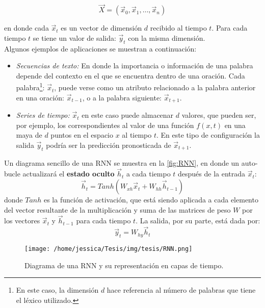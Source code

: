 \begin{equation}
  \label{eq:xdataRNN}
  \vec{X} = (\vec{x}_0, \vec{x}_1, \dots , \vec{x}_n)
\end{equation}

en donde cada $\vec{x}_t$ es un vector de dimensión $d$ recibido al tiempo $t$. Para cada tiempo $t$ se tiene un valor de salida: $\vec{y}_t$ con la misma dimensión.
\\
Algunos ejemplos de aplicaciones se muestran a continuación:

\begin{itemize}[label=\textcolor{CTtitle}{\textbullet}]
\item \emph{Secuencias de texto:} En donde la importancia o información de una palabra depende del contexto en el que se encuentra dentro de una oración. Cada palabra\footnote{En este caso, la dimensión $d$ hace referencia al número de palabras que tiene el léxico utilizado.}: $\vec{x}_t$,  puede verse como un atributo relacionado a la palabra anterior en una oración: $\vec{x}_{t-1}$, o a la palabra siguiente: $\vec{x}_{t+1}$.
 \item \emph{Series de tiempo:} $\vec{x}_t$ en este caso puede almacenar $d$ valores, que pueden ser, por ejemplo, los correspondientes al valor de una función $f(x,t)$ en una maya de $d$ puntos en el espacio $x$ al tiempo $t$. En este tipo de configuración la salida $\vec{y}_t$ podría ser la predicción pronosticada de $\vec{x}_{t+1}$.
 \end{itemize}
  
Un diagrama sencillo de una \acs{RNN} se muestra en la \autoref{fig:RNN}, en donde un auto-bucle actualizará el \textbf{estado oculto} $\vec{h}_t$ a cada tiempo $t$ después de la entrada $\vec{x}_t$:
\begin{equation}
  \label{eq:hidden}
  \vec{h}_t = Tanh(W_{xh}\vec{x}_t + W_{hh} \vec{h}_{t-1})
\end{equation}
donde $Tanh$ es la función de activación, que está siendo aplicada a cada elemento del vector resultante de la multiplicación y suma de las matrices de peso $W$ por los vectores $\vec{x}_t$ y $\vec{h}_{t-1}$ para cada tiempo $t$. La salida, por su parte, está dada por:
\begin{equation}
  \vec{y}_t = W_{hy}\vec{h}_t
\end{equation}

\begin{figure}[!htbp]
  \centering
  \texttt{[image: /home/jessica/Tesis/img/tesis/RNN.png]}
  \caption{Diagrama de una \acs{RNN} y su representación en capas de tiempo.}
  \label{fig:RNN}
\end{figure}

